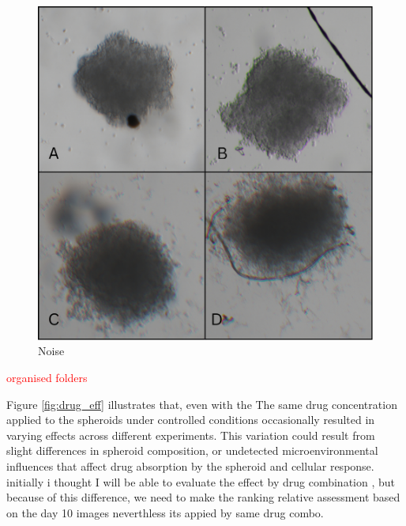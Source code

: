  \begin{figure}[H]
  \centering
  \includegraphics[scale=0.4]{figures/noise.png} 
  \caption{Noise}
  \label{fig:noise}
\end{figure}
 
\textcolor{red}{organised folders}


Figure \ref{fig:drug_eff} illustrates that, even with the The same drug concentration applied to the spheroids under controlled conditions occasionally resulted in 
varying effects across different experiments. This variation could result from slight differences in spheroid composition, or undetected microenvironmental influences 
that affect drug absorption by the spheroid and cellular response.  initially i thought I will be able to evaluate the effect by drug combination , but because of this 
difference, we need to make the ranking relative assessment based on the day 10 images neverthless its appied by same drug combo.

